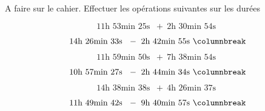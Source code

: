 A faire sur le cahier. Effectuer les opérations suivantes sur les durées
\begin{multicols}{3}
$$11\text{h }53\text{min }25\text{s }~+~2\text{h }30\text{min }54\text{s }$$

$$14\text{h }26\text{min }33\text{s }~-~2\text{h }42\text{min }55\text{s }\columnbreak$$

$$11\text{h }59\text{min }50\text{s }~+~7\text{h }38\text{min }54\text{s }$$

$$10\text{h }57\text{min }27\text{s }~-~2\text{h }44\text{min }34\text{s }\columnbreak$$

$$14\text{h }38\text{min }38\text{s }~+~4\text{h }26\text{min }37\text{s }$$

$$11\text{h }49\text{min }42\text{s }~-~9\text{h }40\text{min }57\text{s }\columnbreak$$

\end{multicols}